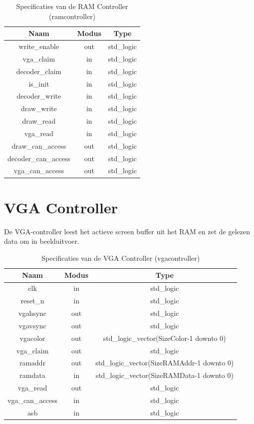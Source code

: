 \documentclass{scrartcl} %
\begin{document}
\begin{table}[H]
\centering
\caption{Specificaties van de RAM Controller (ramcontroller)}
\label{tab:spec-ramcontroller}
\begin{tabular}{c c c}
	\hline\hline
 	Naam & Modus & Type\\
 	\hline	
	write\_enable & out & std\_logic\\
	vga\_claim & in & std\_logic\\
	decoder\_claim & in & std\_logic\\
	is\_init & in & std\_logic\\
	decoder\_write & in & std\_logic\\
	draw\_write & in & std\_logic\\
	draw\_read & in & std\_logic\\
	vga\_read & in & std\_logic\\
	draw\_can\_access & out & std\_logic\\
	decoder\_can\_access & out & std\_logic\\
	vga\_can\_access & out & std\_logic\\
  	\hline
\end{tabular}
\end{table}

\section{VGA Controller}
De VGA-controller leest het actieve screen buffer uit het RAM en zet de gelezen data om in beelduitvoer.

\begin{table}[H]
\centering
\caption{Specificaties van de VGA Controller (vgacontroller)}
\label{tab:spec-vgacontroller}
\begin{tabular}{c c c}
	\hline\hline
 	Naam & Modus & Type\\
 	\hline	
	clk & in & std\_logic \\ 
	reset\_n & in & std\_logic \\ 
	vgahsync & out & std\_logic \\ 
	vgavsync & out & std\_logic \\ 
	vgacolor & out & std\_logic\_vector(SizeColor-1 downto 0) \\
	vga\_claim & out & std\_logic \\ 
	ramaddr & out & std\_logic\_vector(SizeRAMAddr-1 downto 0) \\
	ramdata & in & std\_logic\_vector(SizeRAMData-1 downto 0) \\ 
	vga\_read & out & std\_logic \\
	vga\_can\_access & in & std\_logic \\
	asb & in & std\_logic \\
  	\hline
\end{tabular}
\end{table}
\end{document}
